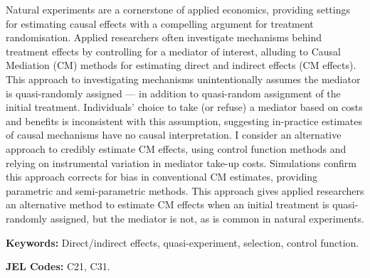 \noindent
Natural experiments are a cornerstone of applied economics, providing settings for estimating causal effects with a compelling argument for treatment randomisation.
Applied researchers often investigate mechanisms behind treatment effects by controlling for a mediator of interest, alluding to Causal Mediation (CM) methods for estimating direct and indirect effects (CM effects).
This approach to investigating mechanisms unintentionally assumes the mediator is quasi-randomly assigned --- in addition to quasi-random assignment of the initial treatment.
Individuals' choice to take (or refuse) a mediator based on costs and benefits is inconsistent with this assumption, suggesting in-practice estimates of causal mechanisms have no causal interpretation.
I consider an alternative approach to credibly estimate CM effects, using control function methods and relying on instrumental variation in mediator take-up costs.
Simulations confirm this approach corrects for bias in conventional CM estimates, providing parametric and semi-parametric methods.
This approach gives applied researchers an alternative method to estimate CM effects when an initial treatment is quasi-randomly assigned, but the mediator is not, as is common in natural experiments.

\vspace{0.5cm}
\noindent
\textbf{Keywords:}
Direct/indirect effects, quasi-experiment, selection, control function.

\vspace{0.1cm}
\noindent
\textbf{JEL Codes:}
C21, C31.
